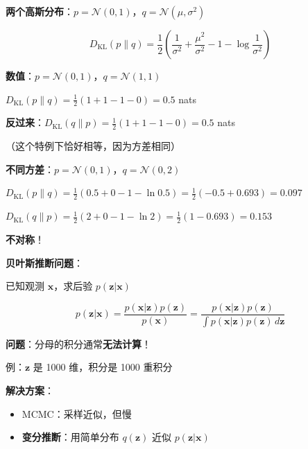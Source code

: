 \documentclass[12pt, a4paper]{ctexart}
\begin{document}
\begin{blackboard}[KL散度的数值例子]

\textbf{两个高斯分布}：$p = \mathcal{N}(0, 1)$，$q = \mathcal{N}(\mu, \sigma^2)$

\[
D_{\text{KL}}(p \| q) = \frac{1}{2}\left( \frac{1}{\sigma^2} + \frac{\mu^2}{\sigma^2} - 1 - \log\frac{1}{\sigma^2} \right)
\]

\textbf{数值}：$p = \mathcal{N}(0, 1)$，$q = \mathcal{N}(1, 1)$

$D_{\text{KL}}(p \| q) = \frac{1}{2}(1 + 1 - 1 - 0) = \mathbf{0.5}$ nats

\textbf{反过来}：$D_{\text{KL}}(q \| p) = \frac{1}{2}(1 + 1 - 1 - 0) = \mathbf{0.5}$ nats

（这个特例下恰好相等，因为方差相同）

\textbf{不同方差}：$p = \mathcal{N}(0, 1)$，$q = \mathcal{N}(0, 2)$

$D_{\text{KL}}(p \| q) = \frac{1}{2}(0.5 + 0 - 1 - \ln 0.5) = \frac{1}{2}(-0.5 + 0.693) = \mathbf{0.097}$

$D_{\text{KL}}(q \| p) = \frac{1}{2}(2 + 0 - 1 - \ln 2) = \frac{1}{2}(1 - 0.693) = \mathbf{0.153}$

\textbf{不对称}！

\end{blackboard}

\begin{blackboard}[变分推断的动机]

\textbf{贝叶斯推断问题}：

已知观测 $\mathbf{x}$，求后验 $p(\mathbf{z} | \mathbf{x})$

\[
p(\mathbf{z} | \mathbf{x}) = \frac{p(\mathbf{x} | \mathbf{z}) p(\mathbf{z})}{p(\mathbf{x})} = \frac{p(\mathbf{x} | \mathbf{z}) p(\mathbf{z})}{\int p(\mathbf{x} | \mathbf{z}) p(\mathbf{z}) \, d\mathbf{z}}
\]

\textbf{问题}：分母的积分通常\textbf{无法计算}！

例：$\mathbf{z}$ 是 1000 维，积分是 1000 重积分

\textbf{解决方案}：
\begin{itemize}
    \item MCMC：采样近似，但慢
    \item \textbf{变分推断}：用简单分布 $q(\mathbf{z})$ 近似 $p(\mathbf{z} | \mathbf{x})$
\end{itemize}

\end{blackboard}
\end{document}

